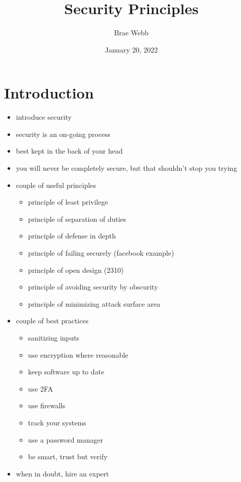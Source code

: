 \documentclass{csse4400}
\title{Security Principles}
\author{Brae Webb}
\date{January 20, 2022}
\begin{document}
\makecover

\maketitle

\section{Introduction}


\begin{drafting}
\begin{itemize}
    \item introduce security
    \item security is an on-going process
    \item best kept in the back of your head
    \item you will never be completely secure, but that shouldn't stop you trying
    \item couple of useful principles
    \begin{itemize}
        \item principle of least privilege
        \item principle of separation of duties
        \item principle of defense in depth
        \item principle of failing securely (facebook example)
        \item principle of open design (2310)
        \item principle of avoiding security by obscurity
        \item principle of minimizing attack surface area
    \end{itemize}
    \item couple of best practices
    \begin{itemize}
        \item sanitizing inputs
        \item use encryption where reasonable
        \item keep software up to date
        \item use 2FA
        \item use firewalls
        \item track your systems
        \item use a password manager
        \item be smart, trust but verify
    \end{itemize}
    \item when in doubt, hire an expert
\end{itemize}
\end{drafting}




\end{document}
